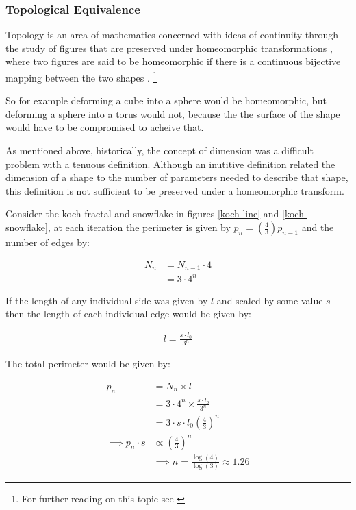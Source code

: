\documentclass[11pt]{article}
\begin{document}
\subsubsection{Topological Equivalence}
\label{topological-equivalence}
Topology is an area of mathematics concerned with ideas of continuity through the study of figures that are preserved under homeomorphic transformations \cite{gilmoreTopologyChaosAlice2002} , where two figures are said to be homeomorphic if there is a continuous bijective mapping between the two shapes \cite[p. 105]{peitgenChaosFractalsNew2004}
.
\footnote{For further reading on this topic see \cite[p. 106]{peitgenChaosFractalsNew2004}}

So for example deforming a cube into a sphere would be homeomorphic, but deforming a sphere into a torus would not, because the the surface of the shape would have to be compromised to acheive that.

As mentioned above, historically, the concept of dimension was a difficult problem with a tenuous
definition.  Although an inutitive definition related the dimension of a shape to
the number of parameters needed to describe that shape, this definition is not
sufficient to be preserved under a homeomorphic transform.

Consider the koch fractal and snowflake in figures \ref{koch-line} and \ref{koch-snowflake}, at each iteration the perimeter is given by \(p_{n}= \left(\frac{4}{3} \right)p_{n-1}\) and the number of edges by:



\begin{align}
N_{n} &= N_{n-1} \cdot 4 \\
&= 3 \cdot 4^{n}
\end{align}

If the length of any individual side was given by \(l\) and scaled by some value \(s\) then the length of each individual edge would be given by:

\begin{align}
l = \frac{s \cdot l_{0}}{3^{n}}
\end{align}

The total perimeter would be given by:

\begin{align}
p_{n} &= N_{n} \times l \\
&= 3\cdot 4^{n} \times \frac{s \cdot l_{o}}{3^{n}} \\
&= 3 \cdot s \cdot  l_{0} \left( \frac{4}{3} \right)^{n}\\
 \implies p_{n} \cdot s & \propto \left(\frac{4}{3}\right)^{n}\\
& \implies  n = \frac{\log\left( 4 \right)}{\log\left( 3 \right)} \approx 1.26
\end{align}
\end{document}
